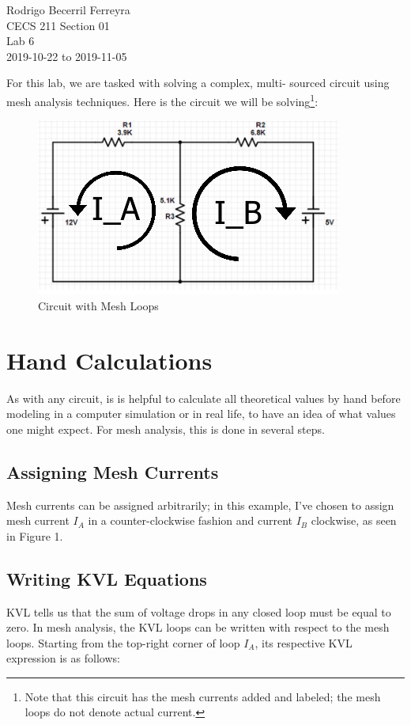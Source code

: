 \documentclass{article}
\begin{document}
\begin{flushright}
    \noindent
    Rodrigo Becerril Ferreyra\\
    CECS 211 Section 01\\
    Lab 6\\
    2019-10-22 to 2019-11-05
\end{flushright}

For this lab, we are tasked with solving a complex, multi-
sourced circuit using mesh analysis techniques. Here is the
circuit we will be solving\footnote{Note that this circuit has the mesh
currents added and labeled; the mesh loops do
not denote actual current.}:

\begin{figure}[h]
    \caption{Circuit with Mesh Loops}
    \centering
    \includegraphics{Images/CircuitWithMeshCurrents.png}
\end{figure}

\section{Hand Calculations} As with any circuit, is is helpful
to calculate all theoretical values by hand before modeling
in a computer simulation or in real life, to have an idea
of what values one might expect. For mesh analysis, this is
done in several steps.

\subsection{Assigning Mesh Currents} Mesh currents can be assigned
arbitrarily; in this example, I've chosen to assign mesh
current \(I_A\) in a counter-clockwise fashion and current
\(I_B\) clockwise, as seen in
Figure 1.

\subsection{Writing KVL Equations} KVL tells us that the sum of
voltage drops in any closed loop must be equal to zero. In
mesh analysis, the KVL loops can be written with respect to 
the mesh loops. Starting from the top-right corner of loop
\(I_A\), its respective KVL expression is as follows:
\end{document}
